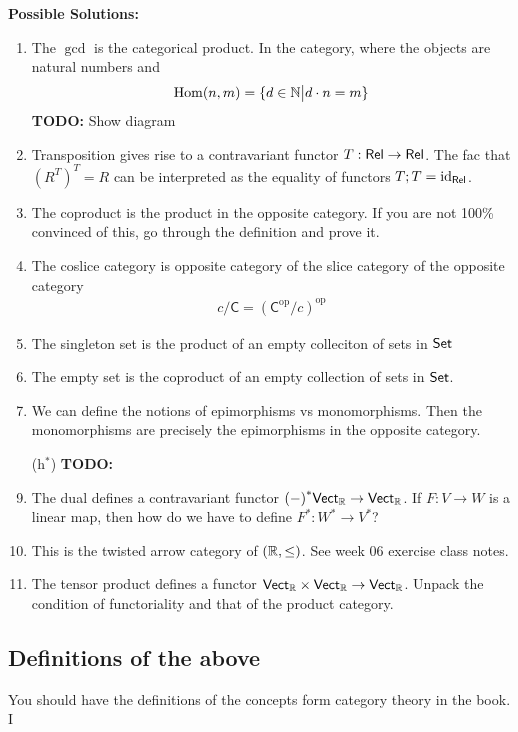 \textbf{Possible Solutions:}
\begin{enumerate}
  \item The $\gcd$ is the categorical product. In the category, where the objects are natural numbers and
    \begin{align*}
      \operatorname{Hom}(n,m) = \{d \in \mathbb{N} \big\vert d \cdot n = m\}
    \end{align*}
    \textbf{TODO:} Show diagram
  \item Transposition gives rise to a contravariant functor $T:\text{\sffamily Rel} \to \text{\sffamily Rel}$. The fac that ${(R^{T})}^{T} = R$ can be interpreted as the equality of functors $T;T = \operatorname{id}_{\text{\sffamily Rel}}$.
  \item The coproduct is the product in the opposite category. If you are not 100\% convinced of this, go through the definition and prove it.
  \item The coslice category is opposite category of the slice category of the opposite category
    \begin{align*}
      c/\textsf{C} = {(\textsf{C}^{\text{op}}/c)}^{\text{op}}
    \end{align*}
  \item The singleton set is the product of an empty colleciton of sets in $\text{\sffamily Set}$
  \item The empty set is the coproduct of an empty collection of sets in $\text{\sffamily Set}$.
  \item We can define the notions of epimorphisms vs monomorphisms. Then the monomorphisms are precisely the epimorphisms in the opposite category.
  \item[(h$^{\ast}$)] \textbf{TODO:}

    \setcounter{enumi}{8}
  \item The dual defines a contravariant functor ${(-)}^{\ast}\text{\sffamily Vect}_{\mathbb{R}} \to \text{\sffamily Vect}_{\mathbb{R}}$.
    If $F: V \to W$ is a linear map, then how do we have to define $F^{\ast}: W^{\ast} \to  V^{\ast}$?
  \item This is the twisted arrow category of $(\mathbb{R},\leq)$. See week 06 exercise class notes.
  \item The tensor product defines a functor $\text{\sffamily Vect}_{\mathbb{R}} \times \text{\sffamily Vect}_{\mathbb{R}} \to \text{\sffamily Vect}_{\mathbb{R}}$. Unpack the condition of functoriality and that of the product category.
\end{enumerate}


\subsection{Definitions of the above}
You should have the definitions of the concepts form category theory in the book. I 



